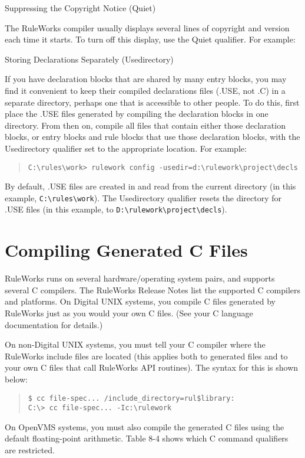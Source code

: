 Suppressing the Copyright Notice (Quiet)

The RuleWorks compiler usually displays several lines of
copyright and version each time it starts. To turn off
this display, use the Quiet qualifier. For example:


Storing Declarations Separately (Usedirectory)

If you have declaration blocks that are shared by many
entry blocks, you may find it convenient to keep their
compiled declarations files (.USE, not .C) in a separate
directory, perhaps one that is accessible to other
people. To do this, first place the .USE files generated
by compiling the declaration blocks in one directory.
From then on, compile all files that contain either those
declaration blocks, or entry blocks and rule blocks that
use those declaration blocks, with the Usedirectory
qualifier set to the appropriate location. For example:
\begin{quote}
\begin{verbatim}
C:\rules\work> rulework config -usedir=d:\rulework\project\decls
\end{verbatim}
\end{quote}
By default, .USE files are created in and read from the
current directory (in this example, \verb|C:\rules\work|). The
Usedirectory qualifier resets the directory for .USE
files (in this example, to \verb|D:\rulework\project\decls|).

\section{Compiling Generated C Files}

RuleWorks runs on several hardware/operating system
pairs, and supports several C compilers. The RuleWorks
Release Notes list the supported C compilers and
platforms. On Digital UNIX systems, you compile C files
generated by RuleWorks just as you would your own C
files. (See your C language documentation for details.)

On non-Digital UNIX systems, you must tell your C
compiler where the RuleWorks include files are located
(this applies both to generated files and to your own C
files that call RuleWorks API routines). The syntax for
this is shown below:
\begin{quote}
\begin{verbatim}
$ cc file-spec... /include_directory=rul$library:
C:\> cc file-spec... -Ic:\rulework
\end{verbatim}
\end{quote}
On OpenVMS systems, you must also compile the generated C
files using the default floating-point arithmetic. Table
8-4 shows which C command qualifiers are restricted.

